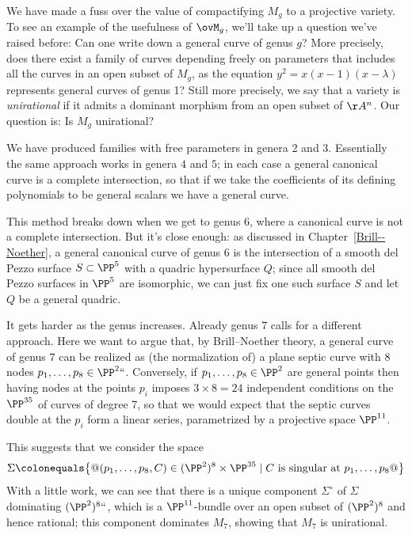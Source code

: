 We have made a fuss over the value of compactifying $M_g$ to a projective variety. To see an example of the usefulness of $\ovM_g$, we'll take up a question we've raised before: Can one write down a general curve of genus $g$?
More precisely,  does there exist a family of curves depending freely
on parameters that includes all the curves in an open subset of
$M_{g}$,
as the equation $y^{2} = x(x-1)(x-\lambda)$
represents general curves of genus 1? Still more precisely,
we say that a variety is \emph{unirational}
%
if it admits a
dominant morphism
%
from an open subset of $\AA^{n}$.
Our question is: Is $M_g$ unirational?

We have produced  families with free parameters in genera 2 and 3. Essentially
the same approach works in genera $4$ and $5$; in each case a general
canonical curve is a
complete intersection,
%
so that if we take the coefficients of its defining polynomials to be
general scalars we have a general curve.

This method breaks down when we get to genus 6, where a canonical curve is not a complete intersection. But it's close enough: as discussed in Chapter~\ref{Brill--Noether}, a general canonical curve of genus 6 is the intersection of a smooth del Pezzo surface $S \subset \PP^5$ with a quadric hypersurface $Q$; since all smooth del Pezzo surfaces in $\PP^5$ are isomorphic, we can just fix one such surface $S$ and let $Q$ be a general quadric.

It gets harder as the genus increases. Already genus 7 calls for a
different approach. Here we want to argue that, by
Brill--Noether theory,
%
a general curve of genus $7$ can be realized as (the normalization of)
a plane
septic curve
%
with 8 nodes $p_1,\dots,p_8 \in \PP^2` `$. Conversely, if $p_1,\dots,p_8 \in \PP^2$ are general points then having nodes at the points $p_i$ imposes $ 3\times 8 = 24$ independent conditions on the $\PP^{35}$ of curves of degree 7, so that we would expect that the septic curves double at the $p_i$ form a linear series, parametrized by a projective space $\PP^{11}$.

This suggests that we consider the space
$$
\Sigma \colonequals \bigl\{@ (p_1,\dots,p_8,C) \in (\PP^2)^8 \times \PP^{35} 
\mid C \text{ is singular at } p_1,\dots,p_8 @\bigr\}
$$
With a little work, we can see that there is a unique component $\Sigma^\circ$ of $\Sigma$ dominating $(\PP^2)^8` `$, which is a $\PP^{11}$-bundle over an open subset of $(\PP^2)^8$ and hence rational; this component dominates $M_7$, showing that $M_7$ is unirational.


